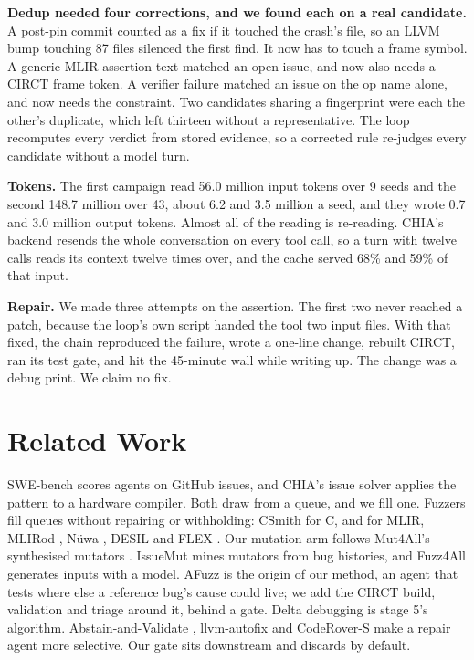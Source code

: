 \documentclass[conference]{IEEEtran}
\begin{document}
\textbf{Dedup needed four corrections, and we found each on a real candidate.}
A post-pin commit counted as a fix if it touched the crash's file, so an LLVM
bump touching 87 files silenced the first find. It now has to touch a frame
symbol. A generic MLIR assertion text matched an open issue, and now also needs
a CIRCT frame token. A verifier failure matched an issue on the op name alone,
and now needs the constraint. Two candidates sharing a fingerprint were each
the other's duplicate, which left thirteen without a representative. %
The loop recomputes every verdict from stored evidence, so a corrected rule
re-judges every candidate without a model turn.

\textbf{Tokens.} The first campaign read 56.0 million input tokens over 9 seeds
and the second 148.7 million over 43, about 6.2 and 3.5 million a seed, and
they wrote 0.7 and 3.0 million output tokens. %
Almost all of the reading is re-reading. CHIA's backend resends the whole
conversation on every tool call, so a turn with twelve calls reads its context
twelve times over, and the cache served 68\% and 59\% of that input. %

\textbf{Repair.} We made three attempts on the assertion. The first two never
reached a patch, because the loop's own script handed the tool two input files.
With that fixed, the chain reproduced the failure, wrote a one-line change,
rebuilt CIRCT, ran its test gate, and hit the 45-minute wall while writing up.
The change was a debug print. We claim no fix. %

\section{Related Work}
SWE-bench \cite{swebench} scores agents on GitHub issues, and CHIA's issue
solver \cite{chia} applies the pattern to a hardware compiler. Both draw from a
queue, and we fill one. Fuzzers fill queues without repairing or withholding:
CSmith \cite{csmith} for C, and for MLIR, MLIRod \cite{mlirod}, N\"uwa
\cite{nuwa}, DESIL \cite{desil} and FLEX \cite{flex}. Our mutation arm follows
Mut4All's synthesised mutators \cite{mut4all}. IssueMut \cite{issuemut} mines
mutators from bug histories, and Fuzz4All \cite{fuzz4all} generates inputs with
a model. AFuzz \cite{afuzz} is the origin of our method, an agent that tests
where else a reference bug's cause could live; we add the CIRCT build,
validation and triage around it, behind a gate.
Delta debugging \cite{deltadebug} is stage 5's algorithm. Abstain-and-Validate
\cite{abstain}, llvm-autofix \cite{llvmharness} and CodeRover-S
\cite{coderovers} make a repair agent more selective. Our gate sits downstream
and discards by default.
\end{document}
